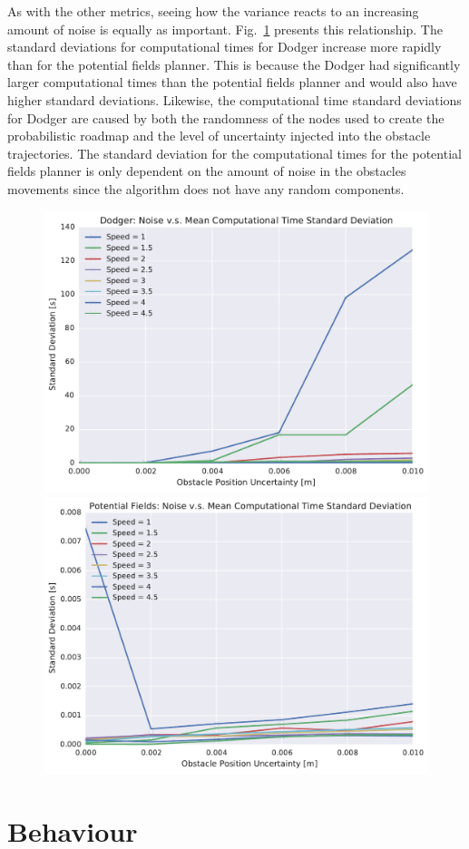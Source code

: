 As with the other metrics, seeing how the variance reacts to an increasing
amount of noise is equally as important. Fig.~\ref{fig:plot_std_comp_time}
presents this relationship. The standard deviations for computational times for
Dodger increase more rapidly than for the potential fields planner. This is
because the Dodger had significantly larger computational times than the
potential fields planner and would also have higher standard deviations.
Likewise, the computational time standard deviations for Dodger are caused by
both the randomness of the nodes used to create the probabilistic roadmap and
the level of uncertainty injected into the obstacle trajectories. The standard
deviation for the computational times for the potential fields planner is only
dependent on the amount of noise in the obstacles movements since the algorithm
does not have any random components.

\begin{figure}[h!]
    \centering
    \includegraphics[width=0.48\linewidth]{figs/planner_std_avg_times_0}
    \includegraphics[width=0.48\linewidth]{figs/pf_std_avg_times_0}
    \caption{}
    \label{fig:plot_std_comp_time}
\end{figure}

\section{Behaviour}


